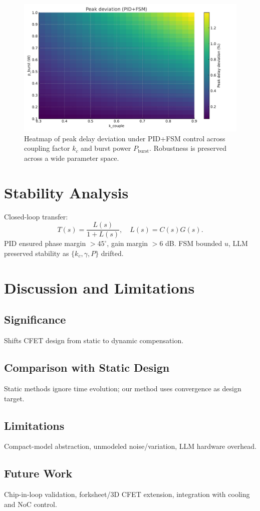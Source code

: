 \documentclass[conference]{IEEEtran}
\begin{document}
\begin{figure}[t]
    \centering
    \includegraphics[width=0.9\linewidth]{figs/heatmap.pdf}
    \caption{Heatmap of peak delay deviation under PID+FSM control across coupling factor $k_c$ and burst power $P_{\text{burst}}$. 
    Robustness is preserved across a wide parameter space.}
    \label{fig:heatmap}
\end{figure}

\section{Stability Analysis}
Closed-loop transfer:
\[
T(s) = \frac{L(s)}{1+L(s)}, \quad L(s)=C(s)G(s).
\]
PID ensured phase margin $>45^\circ$, gain margin $>6$ dB. FSM bounded $u$, LLM preserved stability as $\{k_c,\gamma,P\}$ drifted.

\section{Discussion and Limitations}
\subsection{Significance}
Shifts CFET design from static to dynamic compensation.  
\subsection{Comparison with Static Design}
Static methods ignore time evolution; our method uses convergence as design target.  
\subsection{Limitations}
Compact-model abstraction, unmodeled noise/variation, LLM hardware overhead.  
\subsection{Future Work}
Chip-in-loop validation, forksheet/3D CFET extension, integration with cooling and NoC control.  
\end{document}
